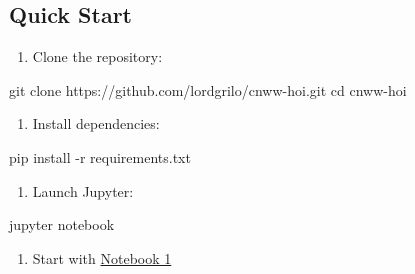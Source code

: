 \documentclass[
  11pt,
  letterpaper,
  oneside,
  openany]{book}
\newenvironment{Shaded}{\begin{snugshade}}{\end{snugshade}}
\newcommand{\AttributeTok}[1]{\textcolor[rgb]{0.40,0.45,0.13}{#1}}
\newcommand{\BuiltInTok}[1]{\textcolor[rgb]{0.00,0.23,0.31}{#1}}
\newcommand{\ExtensionTok}[1]{\textcolor[rgb]{0.00,0.23,0.31}{#1}}
\newcommand{\FunctionTok}[1]{\textcolor[rgb]{0.28,0.35,0.67}{#1}}
\newcommand{\NormalTok}[1]{\textcolor[rgb]{0.00,0.23,0.31}{#1}}
\providecommand{\tightlist}{%
  \setlength{\itemsep}{0pt}\setlength{\parskip}{0pt}}
\begin{document}

\subsection*{Quick Start}\label{quick-start}

\begin{enumerate}
\def\labelenumi{\arabic{enumi}.}
\tightlist
\item
  Clone the repository:
\end{enumerate}

\begin{Shaded}
\begin{Highlighting}[]
\FunctionTok{git}\NormalTok{ clone https://github.com/lordgrilo/cnww{-}hoi.git}
\BuiltInTok{cd}\NormalTok{ cnww{-}hoi}
\end{Highlighting}
\end{Shaded}

\begin{enumerate}
\def\labelenumi{\arabic{enumi}.}
\setcounter{enumi}{1}
\tightlist
\item
  Install dependencies:
\end{enumerate}

\begin{Shaded}
\begin{Highlighting}[]
\ExtensionTok{pip}\NormalTok{ install }\AttributeTok{{-}r}\NormalTok{ requirements.txt}
\end{Highlighting}
\end{Shaded}

\begin{enumerate}
\def\labelenumi{\arabic{enumi}.}
\setcounter{enumi}{2}
\tightlist
\item
  Launch Jupyter:
\end{enumerate}

\begin{Shaded}
\begin{Highlighting}[]
\ExtensionTok{jupyter}\NormalTok{ notebook}
\end{Highlighting}
\end{Shaded}

\begin{enumerate}
\def\labelenumi{\arabic{enumi}.}
\setcounter{enumi}{3}
\tightlist
\item
  Start with \href{01_information_theory_foundations.ipynb}{Notebook 1}
\end{enumerate}
\end{document}

